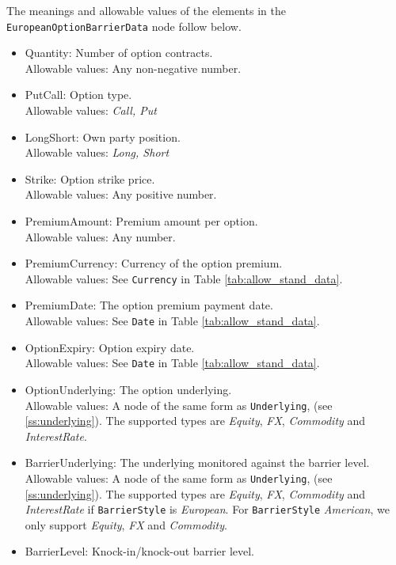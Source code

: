 The meanings and allowable values of the elements in the \lstinline!EuropeanOptionBarrierData! node follow below.
 
\begin{itemize} 
  \item Quantity: Number of option contracts. \\
  Allowable values: Any non-negative number.
  \item PutCall: Option type. \\
  Allowable values: \emph{Call, Put}
  \item LongShort: Own party position. \\
  Allowable values: \emph{Long, Short}
  \item Strike: Option strike price. \\
  Allowable values: Any positive number.
  \item PremiumAmount: Premium amount per option. \\
  Allowable values: Any number.
  \item PremiumCurrency: Currency of the option premium. \\
  Allowable values: See \lstinline!Currency! in Table \ref{tab:allow_stand_data}.
  \item PremiumDate: The option premium payment date. \\
  Allowable values: See \lstinline!Date! in Table \ref{tab:allow_stand_data}.
  \item OptionExpiry: Option expiry date. \\
  Allowable values: See \lstinline!Date! in Table \ref{tab:allow_stand_data}.
  \item OptionUnderlying: The option underlying. \\
  Allowable values: A node of the same form as \lstinline!Underlying!, (see \ref{ss:underlying}). The supported types
  are \emph{Equity}, \emph{FX}, \emph{Commodity} and \emph{InterestRate}. \\
  \item BarrierUnderlying: The underlying monitored against the barrier level. \\
  Allowable values: A node of the same form as \lstinline!Underlying!, (see \ref{ss:underlying}). The supported types
  are \emph{Equity}, \emph{FX}, \emph{Commodity} and \emph{InterestRate} if \lstinline!BarrierStyle! is \emph{European}. For \lstinline!BarrierStyle!
  \emph{American}, we only support \emph{Equity}, \emph{FX} and \emph{Commodity}.
  \item BarrierLevel: Knock-in/knock-out barrier level. \\

\end{itemize}
